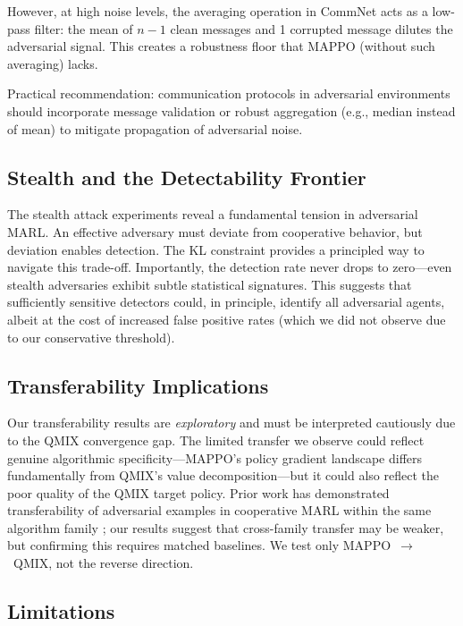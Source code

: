 \documentclass[12pt,a4paper]{article}
\begin{document}
However, at high noise levels, the averaging operation in CommNet acts as a low-pass filter: the mean of $n-1$ clean messages and 1 corrupted message dilutes the adversarial signal. This creates a robustness floor that MAPPO (without such averaging) lacks.

Practical recommendation: communication protocols in adversarial environments should incorporate message validation or robust aggregation (e.g., median instead of mean) to mitigate propagation of adversarial noise.

\subsection{Stealth and the Detectability Frontier}

The stealth attack experiments reveal a fundamental tension in adversarial MARL. An effective adversary must deviate from cooperative behavior, but deviation enables detection. The KL constraint provides a principled way to navigate this trade-off. Importantly, the detection rate never drops to zero---even stealth adversaries exhibit subtle statistical signatures. This suggests that sufficiently sensitive detectors could, in principle, identify all adversarial agents, albeit at the cost of increased false positive rates (which we did not observe due to our conservative threshold).

\subsection{Transferability Implications}

Our transferability results are \emph{exploratory} and must be interpreted cautiously due to the QMIX convergence gap. The limited transfer we observe could reflect genuine algorithmic specificity---MAPPO's policy gradient landscape differs fundamentally from QMIX's value decomposition---but it could also reflect the poor quality of the QMIX target policy. Prior work has demonstrated transferability of adversarial examples in cooperative MARL within the same algorithm family \citep{guo2022towards}; our results suggest that cross-family transfer may be weaker, but confirming this requires matched baselines. We test only MAPPO~$\to$~QMIX, not the reverse direction.

\subsection{Limitations}
\end{document}
